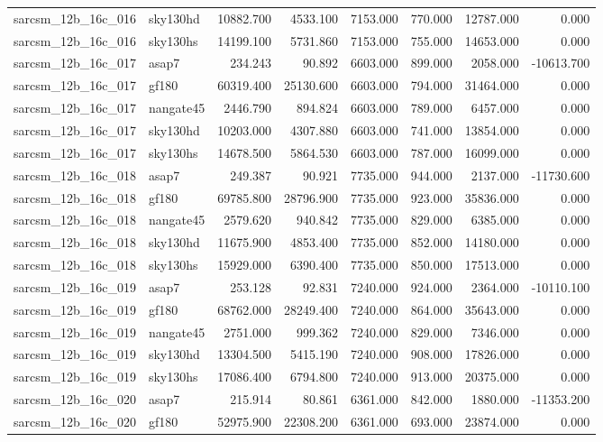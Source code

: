 \begin{tabular}{llrrrrrr}
sarcsm\_12b\_16c\_016 & sky130hd & 10882.700 & 4533.100 & 7153.000 & 770.000 & 12787.000 & 0.000 \\
sarcsm\_12b\_16c\_016 & sky130hs & 14199.100 & 5731.860 & 7153.000 & 755.000 & 14653.000 & 0.000 \\
sarcsm\_12b\_16c\_017 & asap7 & 234.243 & 90.892 & 6603.000 & 899.000 & 2058.000 & -10613.700 \\
sarcsm\_12b\_16c\_017 & gf180 & 60319.400 & 25130.600 & 6603.000 & 794.000 & 31464.000 & 0.000 \\
sarcsm\_12b\_16c\_017 & nangate45 & 2446.790 & 894.824 & 6603.000 & 789.000 & 6457.000 & 0.000 \\
sarcsm\_12b\_16c\_017 & sky130hd & 10203.000 & 4307.880 & 6603.000 & 741.000 & 13854.000 & 0.000 \\
sarcsm\_12b\_16c\_017 & sky130hs & 14678.500 & 5864.530 & 6603.000 & 787.000 & 16099.000 & 0.000 \\
sarcsm\_12b\_16c\_018 & asap7 & 249.387 & 90.921 & 7735.000 & 944.000 & 2137.000 & -11730.600 \\
sarcsm\_12b\_16c\_018 & gf180 & 69785.800 & 28796.900 & 7735.000 & 923.000 & 35836.000 & 0.000 \\
sarcsm\_12b\_16c\_018 & nangate45 & 2579.620 & 940.842 & 7735.000 & 829.000 & 6385.000 & 0.000 \\
sarcsm\_12b\_16c\_018 & sky130hd & 11675.900 & 4853.400 & 7735.000 & 852.000 & 14180.000 & 0.000 \\
sarcsm\_12b\_16c\_018 & sky130hs & 15929.000 & 6390.400 & 7735.000 & 850.000 & 17513.000 & 0.000 \\
sarcsm\_12b\_16c\_019 & asap7 & 253.128 & 92.831 & 7240.000 & 924.000 & 2364.000 & -10110.100 \\
sarcsm\_12b\_16c\_019 & gf180 & 68762.000 & 28249.400 & 7240.000 & 864.000 & 35643.000 & 0.000 \\
sarcsm\_12b\_16c\_019 & nangate45 & 2751.000 & 999.362 & 7240.000 & 829.000 & 7346.000 & 0.000 \\
sarcsm\_12b\_16c\_019 & sky130hd & 13304.500 & 5415.190 & 7240.000 & 908.000 & 17826.000 & 0.000 \\
sarcsm\_12b\_16c\_019 & sky130hs & 17086.400 & 6794.800 & 7240.000 & 913.000 & 20375.000 & 0.000 \\
sarcsm\_12b\_16c\_020 & asap7 & 215.914 & 80.861 & 6361.000 & 842.000 & 1880.000 & -11353.200 \\
sarcsm\_12b\_16c\_020 & gf180 & 52975.900 & 22308.200 & 6361.000 & 693.000 & 23874.000 & 0.000 \\

\end{tabular}
